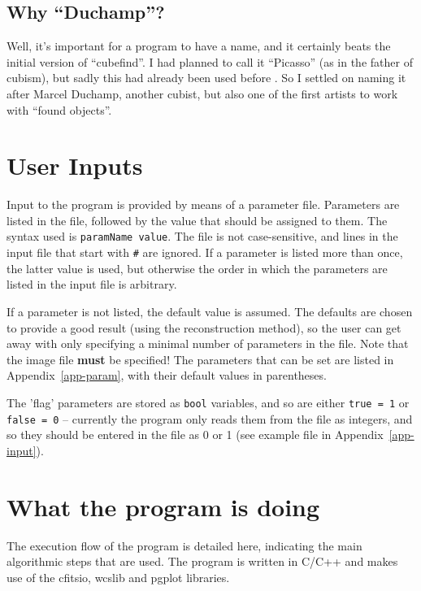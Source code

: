 \documentclass[12pt]{article}
\begin{document}
\subsection{Why ``Duchamp''?}

Well, it's important for a program to have a name, and it certainly
beats the initial version of ``cubefind''. I had planned to call it
``Picasso'' (as in the father of cubism), but sadly this had already
been used before \citep{minchin99}. So I settled on naming it after
Marcel Duchamp, another cubist, but also one of the first artists to
work with ``found objects''.

\section{User Inputs}
\label{sec-param}

Input to the program is provided by means of a parameter file. Parameters
are listed in the file, followed by the value that should be assigned
to them. The syntax used is {\tt paramName value}. The file is not
case-sensitive, and lines in the input file that start with {\tt \#} are
ignored. If a parameter is listed more than once, the latter value is
used, but otherwise the order in which the parameters are listed in the
input file is arbitrary. 

If a parameter is not listed, the default value is assumed. The
defaults are chosen to provide a good result (using the reconstruction
method), so the user can get away with only specifying a minimal
number of parameters in the file. Note that the image file {\bf must}
be specified! The parameters that can be set are listed in
Appendix~\ref{app-param}, with their default values in parentheses.

The 'flag' parameters are stored as {\tt bool} variables, and so are
either {\tt true = 1} or {\tt false = 0} -- currently the program only
reads them from the file as integers, and so they should be entered in
the file as 0 or 1 (see example file in Appendix~\ref{app-input}).

\section{What the program is doing}
\label{sec-flow}

The execution flow of the program is detailed here, indicating the
main algorithmic steps that are used. The program is written in C/C++
and makes use of the {\sc cfitsio}, {\sc wcslib} and {\sc pgplot}
libraries. 
\end{document}
